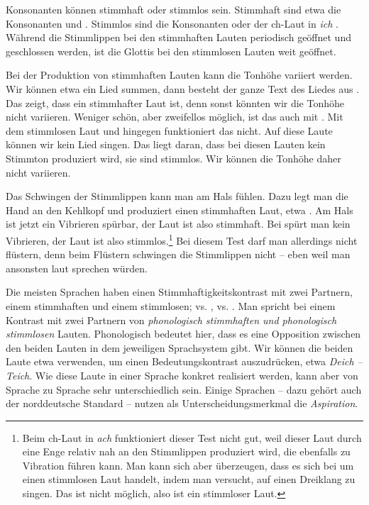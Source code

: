 Konsonanten können stimmhaft oder stimmlos sein. Stimmhaft sind etwa die Konsonanten \textipa{[l]} und \textipa{[m]}. Stimmlos sind die Konsonanten \textipa{[f]} oder der ch-Laut in \textit{ich} \textipa{[\c{c}]}. Während die Stimmlippen bei den stimmhaften Lauten periodisch geöffnet und geschlossen werden, ist die Glottis bei den stimmlosen Lauten weit geöffnet.

Bei der Produktion von stimmhaften Lauten kann die Tonhöhe variiert werden. Wir können etwa ein Lied summen, dann besteht der ganze Text des Liedes aus \textipa{[m]}. Das zeigt, dass \textipa{[m]} ein stimmhafter Laut ist, denn sonst könnten wir die Tonhöhe nicht variieren. Weniger schön, aber zweifellos möglich, ist das auch mit \textipa{[l]}. Mit dem stimmlosen Laut \textipa{[f]} und \textipa{[\c{c}]} hingegen funktioniert das nicht. Auf diese Laute können wir kein Lied singen. Das liegt daran, dass bei diesen Lauten kein Stimmton produziert wird, sie sind stimmlos. Wir können die Tonhöhe daher nicht variieren.

Das Schwingen der Stimmlippen kann man am Hals fühlen. Dazu legt man die Hand an den Kehlkopf und produziert einen stimmhaften Laut, etwa \textipa{[m]}. Am Hals ist jetzt ein Vibrieren spürbar, der Laut ist also stimmhaft. Bei \textipa{[f]} spürt man kein Vibrieren, der Laut ist also stimmlos.\footnote{Beim ch-Laut \textipa{[X]} in \textit{ach} funktioniert dieser Test nicht gut, weil dieser Laut durch eine Enge relativ nah an den Stimmlippen produziert wird, die ebenfalls zu Vibration führen kann. Man kann sich aber überzeugen, dass es sich bei \textipa{[X]} um einen stimmlosen Laut handelt, indem man versucht, auf \textipa{[X]} einen Dreiklang zu singen. Das ist nicht möglich, also ist \textipa{[X]} ein stimmloser Laut.} Bei diesem Test darf man allerdings nicht flüstern, denn beim Flüstern schwingen die Stimmlippen nicht -- eben weil man ansonsten laut sprechen würden.


Die meisten Sprachen haben einen Stimmhaftigkeitskontrast mit zwei Partnern, einem stimmhaften und einem stimmlosen; \textipa{[b]} vs. \textipa{[p]}, \textipa{[g]} vs. \textipa{[k]}. Man spricht bei einem Kontrast mit zwei Partnern von \textit{phonologisch stimmhaften und phonologisch stimmlosen} Lauten. Phonologisch bedeutet hier, dass es eine Opposition zwischen den beiden Lauten in dem jeweiligen Sprachsystem gibt. Wir können die beiden Laute etwa verwenden, um einen Bedeutungskontrast auszudrücken, etwa \textit{Deich -- Teich}. Wie diese Laute in einer Sprache konkret realisiert werden, kann aber von Sprache zu Sprache sehr unterschiedlich sein. Einige Sprachen -- dazu gehört auch der norddeutsche Standard -- nutzen als Unterscheidungsmerkmal die \textit{Aspiration}.

